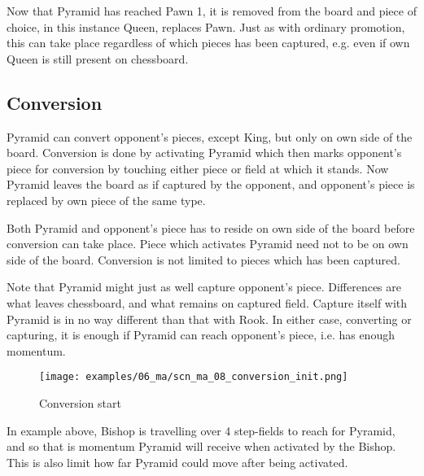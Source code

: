 Now that Pyramid has reached Pawn 1, it is removed from the board and piece of
choice, in this instance Queen, replaces Pawn. Just as with ordinary promotion,
this can take place regardless of which pieces has been captured, e.g. even if
own Queen is still present on chessboard.

\clearpage %

\subsection*{Conversion}
\label{sec:Mayan Ascendancy/Pyramid/Conversion}

Pyramid can convert opponent's pieces, except King, but only on own side of
the board. Conversion is done by activating Pyramid which then marks opponent's
piece for conversion by touching either piece or field at which it stands. Now
Pyramid leaves the board as if captured by the opponent, and opponent's piece
is replaced by own piece of the same type.

Both Pyramid and opponent's piece has to reside on own side of the board before
conversion can take place. Piece which activates Pyramid need not to be on own
side of the board. Conversion is not limited to pieces which has been captured.

Note that Pyramid might just as well capture opponent's piece. Differences are
what leaves chessboard, and what remains on captured field. Capture itself with
Pyramid is in no way different than that with Rook. In either case, converting
or capturing, it is enough if Pyramid can reach opponent's piece, i.e. has
enough momentum.

\clearpage %

\noindent
\begin{figure}[!h]
\texttt{[image: examples/06\_ma/scn\_ma\_08\_conversion\_init.png]}
\caption{Conversion start}
\label{fig:scn_ma_08_conversion_init}
\end{figure}

In example above, Bishop is travelling over 4 step-fields to reach for Pyramid,
and so that is momentum Pyramid will receive when activated by the Bishop.
This is also limit how far Pyramid could move after being activated.

